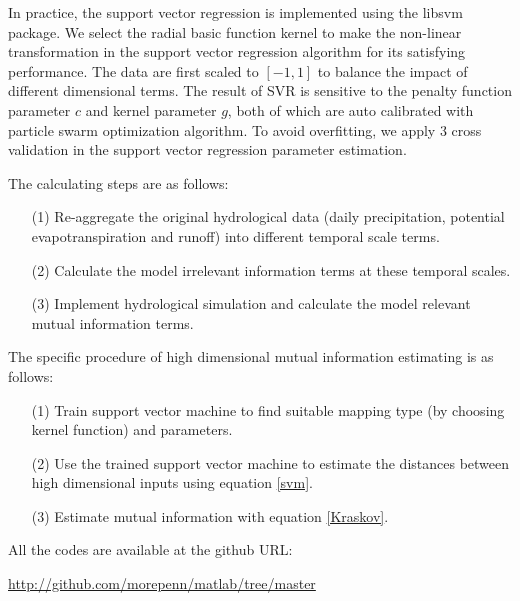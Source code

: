 \documentclass[draft,wrr]{AGUTeX}
\begin{document}
\begin{article}
In practice, the support vector regression is implemented using the libsvm package\citep{chang2011libsvm}.  We select the radial basic function kernel to make the non-linear transformation in the support vector regression algorithm for its satisfying performance. The data are first scaled to $[-1,1]$ to balance the impact of different dimensional terms. The result of SVR is sensitive to the penalty function parameter $c$ and kernel parameter $g$, both of which are auto calibrated with particle swarm optimization algorithm\citep{shi1998modified}. To avoid overfitting, we apply  3 cross validation in the support vector regression parameter estimation. 

The calculating steps are as follows:
 \begin{enumerate}
 \item [(1)]Re-aggregate the original hydrological data (daily precipitation, potential evapotranspiration and runoff) into different temporal scale terms. 
 \item [(2)]Calculate the  model irrelevant information terms  at these temporal scales.
 \item [(3)]Implement hydrological simulation and calculate the model relevant mutual information terms.
 \end{enumerate}

The specific procedure of high dimensional mutual information estimating is as follows:
\begin{enumerate}
\item [(1)]Train support vector machine to find suitable mapping type (by choosing kernel function) and parameters.
\item [(2)]Use the trained support vector machine to estimate the distances between high dimensional inputs using equation \ref{svm}.
\item [(3)]Estimate mutual information with equation \ref{Kraskov}.
\end{enumerate}

 
All the codes are available at the github URL: 

\underline{http://github.com/morepenn/matlab/tree/master}
 

\end{article}
\end{document}
